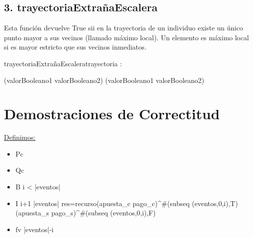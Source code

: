 \documentclass[10pt,a4paper]{article}
\begin{document}
	\subsection*{3. trayectoriaExtrañaEscalera}
	Esta función devuelve True sii en la trayectoria de un individuo existe un único punto mayor a sus vecinos (llamado máximo local). Un elemento es máximo local si es mayor estricto que sus vecinos inmediatos.



	\begin{proc}{trayectoriaExtrañaEscalera}{\In trayectoria : \TLista{\float}}{\bool}
		
		\hfill





		{(valorBooleano1 \wedge \neg valorBooleano2) \lor (\neg valorBooleano1 \wedge valorBooleano2)}

		
	\end{proc}

	\section{Demostraciones de Correctitud}

	\underline{Definimos:}
	
	\begin{itemize} 
		\item Pc 
	
		\item Qc 
	
		\item B \equiv i < |eventos|
	
		\item I  \leq i+1 \leq |eventos| \yLuego res=recurso(apuesta_c pago_c)^{\#(subseq (eventos,0,i),T)} (apuesta_s pago_s)^{\#(subseq (eventos,0,i),F)}
	
		\item fv \equiv |eventos|-i
	\end{itemize}
	
\end{document}
